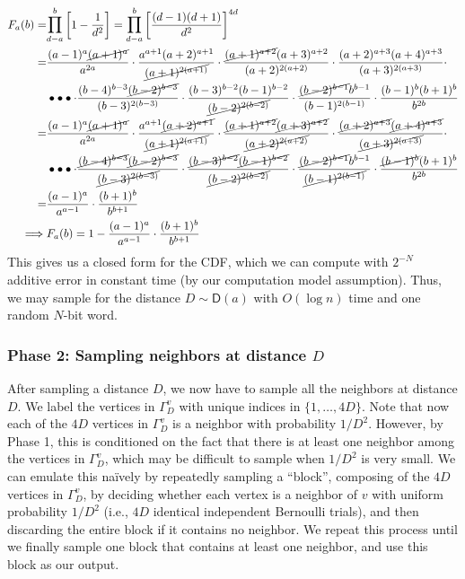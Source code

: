 \begin{align}
F_a(b) = &\mathlarger\prod\limits_{d-a}^{b} \left[1-\frac{1}{d^2}\right] = \mathlarger\prod\limits_{d-a}^{b} \left[\frac{(d-1)(d+1)}{d^2}\right]^{4d} \\
= & \frac{(a-1)^{a}\cancel{(a+1)^{a}}}{a^{2a}}\cdot\frac{a^{a+1}(a+2)^{a+1}}{\cancel{(a+1)^{2(a+1)}}}
\cdot\frac{\cancel{(a+1)^{a+2}}(a+3)^{a+2}}{(a+2)^{2(a+2)}}\cdot\frac{(a+2)^{a+3}(a+4)^{a+3}}{(a+3)^{2(a+3)}}\cdot\\
&\bullet\bullet\bullet
\cdot\frac{(b-4)^{b-3}\cancel{(b-2)^{b-3}}}{(b-3)^{2(b-3)}}\cdot\frac{(b-3)^{b-2}(b-1)^{b-2}}{\cancel{(b-2)^{2(b-2)}}}
\cdot\frac{\cancel{(b-2)^{b-1}}b^{b-1}}{(b-1)^{2(b-1)}}\cdot\frac{(b-1)^{b}(b+1)^{b}}{b^{2b}} \\
= & \frac{(a-1)^{a}\cancel{(a+1)^{a}}}{a^{2a}}\cdot\frac{a^{a+1}\cancel{(a+2)^{a+1}}}{\cancel{(a+1)^{2(a+1)}}}
\cdot\frac{\cancel{(a+1)^{a+2}}\cancel{(a+3)^{a+2}}}{\cancel{(a+2)^{2(a+2)}}}
\cdot\frac{\cancel{(a+2)^{a+3}}\cancel{(a+4)^{a+3}}}{\cancel{(a+3)^{2(a+3)}}}\cdot\\
&\bullet\bullet\bullet
\cdot\frac{\cancel{(b-4)^{b-3}}\cancel{(b-2)^{b-3}}}{\cancel{(b-3)^{2(b-3)}}}
\cdot\frac{\cancel{(b-3)^{b-2}}\cancel{(b-1)^{b-2}}}{\cancel{(b-2)^{2(b-2)}}}
\cdot\frac{\cancel{(b-2)^{b-1}}b^{b-1}}{\cancel{(b-1)^{2(b-1)}}}\cdot\frac{\cancel{(b-1)^{b}}(b+1)^{b}}{b^{2b}} \\
= & \frac{(a-1)^{a}}{a^{a-1}}\cdot\frac{(b+1)^{b}}{b^{b+1}} \\
\implies & F_a(b) = 1 - \frac{(a-1)^{a}}{a^{a-1}}\cdot\frac{(b+1)^{b}}{b^{b+1}}
\end{align}
\fi
This gives us a closed form for the CDF, which we can compute with $2^{-N}$ additive error in constant time (by our computation model assumption).
Thus, we may sample for the distance $D\sim\mathsf{D}(a)$ with $O(\log n)$ time and one random $N$-bit word.

\subsubsection{Phase 2: Sampling neighbors at distance $D$}
After sampling a distance $D$, we now have to sample all the neighbors at distance $D$.
We label the vertices in $\Gamma_D^v$ with unique indices in $\{1, \ldots, 4D\}$.
Note that now each of the $4D$ vertices in $\Gamma_D^v$ is a neighbor with probability $1/D^2$.
However, by Phase 1, this is conditioned on the fact that there is at least one neighbor among the vertices in $\Gamma_D^v$,
which may be difficult to sample when $1/D^2$ is very small.
We can emulate this na\"{i}vely by repeatedly sampling a ``block'', composing of the $4D$ vertices in $\Gamma_D^v$, by deciding whether each vertex is a neighbor of $v$ with uniform probability $1/D^2$ (i.e., $4D$ identical independent Bernoulli trials), and then discarding the entire block if it contains no neighbor. We repeat this process until we finally sample one block that contains at least one neighbor, and use this block as our output.

